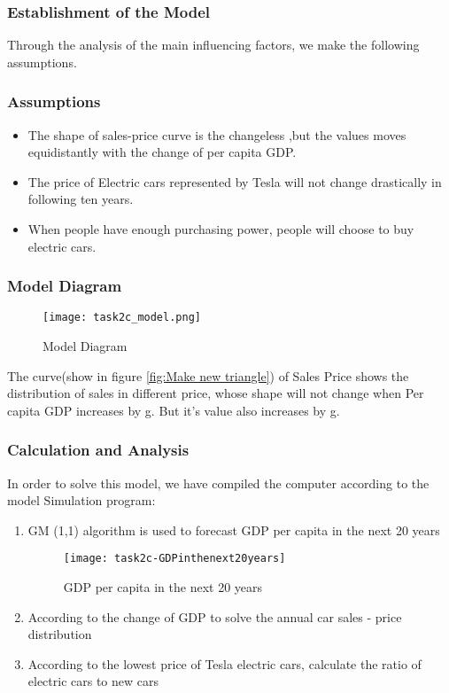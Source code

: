 \documentclass{mcmthesis}
\begin{document}
\subsubsection{Establishment of the Model}


\par Through the analysis of the main influencing factors, we make the following assumptions.

\subsubsection*{Assumptions}
\begin{itemize}
	\item The shape of sales-price  curve is the changeless ,but the values moves equidistantly with the change of per capita GDP.
	\item The price of Electric cars represented by Tesla will not change drastically in following ten years.
	\item When people have enough purchasing power, people will choose to buy electric cars.
\end{itemize}

\subsubsection*{Model Diagram} 

\begin{figure}[!h]
\small
\centering
\texttt{[image: task2c\_model.png]}
\caption{Model Diagram} \label{fig:Model Diagram}
\end{figure}

\par The curve(show in figure \ref{fig:Make new triangle}) of Sales Price shows the distribution of sales in different price, whose shape will not change when Per capita GDP increases by g. But it's value also increases by g.



\subsubsection{Calculation and Analysis}

\par In order to solve this model, we have compiled the computer according to the model Simulation program:
\begin{enumerate}
	\item GM (1,1) algorithm is used to forecast GDP per capita in the next 20 years 
		
		\begin{figure}[!h]
			\small
			\centering
			\texttt{[image: task2c-GDPinthenext20years]}
			\caption{GDP per capita in the next 20 years} \label{fig:GDP per capita in the next 20 years}
		\end{figure}

	\item According to the change of GDP to solve the annual car sales - price distribution
	\item According to the lowest price of Tesla electric cars, calculate the ratio of electric cars to new cars 
\end{enumerate}
\end{document}
